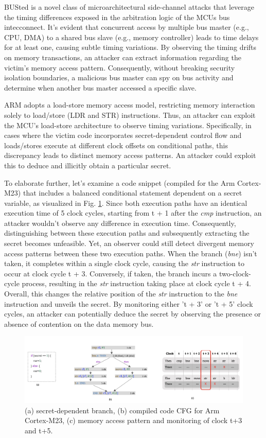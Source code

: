BUSted \cite{busted} is a novel class of microarchitectural side-channel attacks that leverage the timing differences exposed in the arbitration logic of the MCUs bus intecconnect. It's evident that concurrent access by multiple bus master (e.g., CPU, DMA) to a shared bus slave (e.g., memory controller) leads to time delays for at least one, causing subtle timing variations. By observing the timing drifts on memory transactions, an attacker can extract information regarding the victim’s memory access pattern. Consequently, without breaking security isolation boundaries, a malicious bus master can spy on bus activity and determine when another bus master accessed a specific slave.

ARM adopts a load-store memory access model, restricting memory interaction solely to load/store (LDR and STR) instructions. Thus, an attacker can exploit the MCU's load-store architecture to observe timing variations. Specifically, in cases where the victim code incorporates secret-dependent control flow and loads/stores execute at different clock offsets on conditional paths, this discrepancy leads to distinct memory access patterns. An attacker could exploit this to deduce and illicitly obtain a particular secret.

To elaborate further, let's examine a code snippet (compiled for the Arm Cortex-M23) that includes a balanced conditional statement dependent on a secret variable, as visualized in Fig. \ref{fig:busted}. Since both execution paths have an identical execution time of 5 clock cycles, starting from t + 1 after the \textit{cmp} instruction, an attacker wouldn't observe any difference in execution time. Consequently, distinguishing between these execution paths and subsequently extracting the secret becomes unfeasible. Yet, an observer could still detect divergent memory access patterns between these two execution paths. When the branch (\textit{bne}) isn't taken, it completes within a single clock cycle, causing the \textit{str} instruction to occur at clock cycle t + 3. Conversely, if taken, the branch incurs a two-clock-cycle process, resulting in the \textit{str} instruction taking place at clock cycle t + 4. Overall, this changes the relative position of the \textit{str} instruction to the \textit{bne} instruction and unveils the secret. By monitoring either 't + 3' or 't + 5' clock cycles, an attacker can potentially deduce the secret by observing the presence or absence of contention on the data memory bus.

\begin{figure}
  \centering
  \medskip
  \includegraphics[width=.9\textwidth]{figures/busted.jpg}
  \caption[Short caption for Table of Figures]{(a) secret-dependent branch, (b) compiled code CFG for Arm Cortex-M23, (c) memory access pattern and monitoring of clock t+3 and t+5.}
  \label{fig:busted}
\end{figure}


